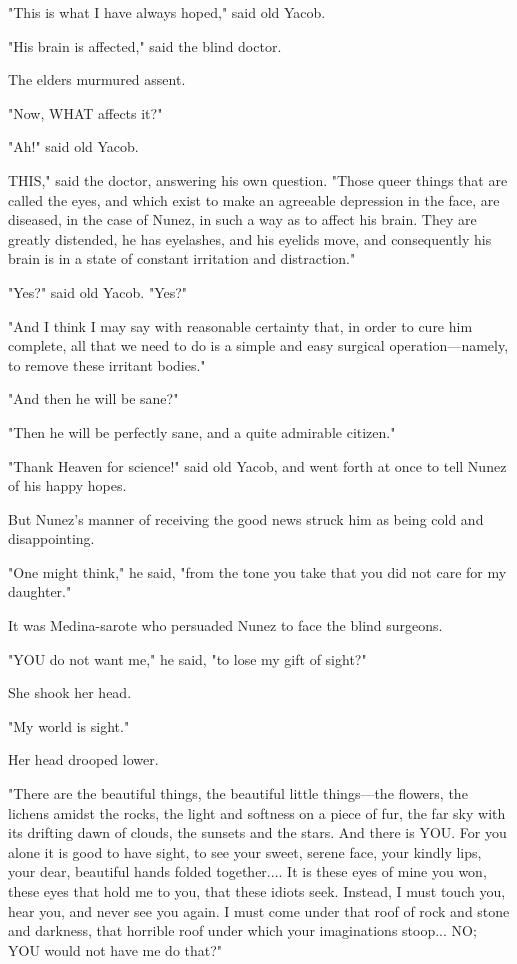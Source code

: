 \documentclass[courier]{sffms}
\begin{document}
"This is what I have always hoped," said old Yacob.

"His brain is affected," said the blind doctor.

The elders murmured assent.

"Now, WHAT affects it?"

"Ah!" said old Yacob.

THIS," said the doctor, answering his own question. "Those queer
things that are called the eyes, and which exist to make an agreeable
depression in the face, are diseased, in the case of Nunez, in such a
way as to affect his brain. They are greatly distended, he has
eyelashes, and his eyelids move, and consequently his brain is in a
state of constant irritation and distraction."

"Yes?" said old Yacob. "Yes?"

"And I think I may say with reasonable certainty that, in order to
cure him complete, all that we need to do is a simple and easy
surgical operation---namely, to remove these irritant bodies."

"And then he will be sane?"

"Then he will be perfectly sane, and a quite admirable citizen."

"Thank Heaven for science!" said old Yacob, and went forth at once to
tell Nunez of his happy hopes.

But Nunez's manner of receiving the good news struck him as being cold
and disappointing.

"One might think," he said, "from the tone you take that you did not
care for my daughter."

It was Medina-sarote who persuaded Nunez to face the blind surgeons.

"YOU do not want me," he said, "to lose my gift of sight?"

She shook her head.

"My world is sight."

Her head drooped lower.

"There are the beautiful things, the beautiful little things---the
flowers, the lichens amidst the rocks, the light and softness on a
piece of fur, the far sky with its drifting dawn of clouds, the
sunsets and the stars. And there is YOU.  For you alone it is good to
have sight, to see your sweet, serene face, your kindly lips, your
dear, beautiful hands folded together.... It is these eyes of
mine you won, these eyes that hold me to you, that these idiots seek.
Instead, I must touch you, hear you, and never see you again. I must
come under that roof of rock and stone and darkness, that horrible
roof under which your imaginations stoop...  NO; YOU would not have
me do that?"
\end{document}
